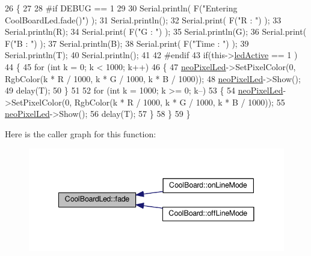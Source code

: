 \begin{DoxyCode}
26 \{
27 
28 \textcolor{preprocessor}{#if DEBUG == 1}
29 
30     Serial.println( F(\textcolor{stringliteral}{"Entering CoolBoardLed.fade()"}) );
31     Serial.println();
32     Serial.print( F(\textcolor{stringliteral}{"R : "}) );
33     Serial.println(R);
34     Serial.print( F(\textcolor{stringliteral}{"G : "}) );
35     Serial.println(G);
36     Serial.print( F(\textcolor{stringliteral}{"B : "}) );
37     Serial.println(B);
38     Serial.print( F(\textcolor{stringliteral}{"Time : "}) );
39     Serial.println(T);
40     Serial.println();
41 
42 \textcolor{preprocessor}{#endif  }
43     \textcolor{keywordflow}{if}(this->\hyperlink{class_cool_board_led_aadd04d2ecf123247718d77f42fba7f08}{ledActive} == 1 )
44     \{
45         \textcolor{keywordflow}{for} (\textcolor{keywordtype}{int} k = 0; k < 1000; k++) 
46         \{
47             \hyperlink{class_cool_board_led_ac2c13fa462a010cd9242bf297c013923}{neoPixelLed}->SetPixelColor(0, RgbColor(k * R / 1000, k * G / 1000, k * B / 1000));
48             \hyperlink{class_cool_board_led_ac2c13fa462a010cd9242bf297c013923}{neoPixelLed}->Show();
49             delay(T);
50         \}
51         
52         \textcolor{keywordflow}{for} (\textcolor{keywordtype}{int} k = 1000; k >= 0; k--) 
53         \{
54             \hyperlink{class_cool_board_led_ac2c13fa462a010cd9242bf297c013923}{neoPixelLed}->SetPixelColor(0, RgbColor(k * R / 1000, k * G / 1000, k * B / 1000));
55             \hyperlink{class_cool_board_led_ac2c13fa462a010cd9242bf297c013923}{neoPixelLed}->Show();
56             delay(T);
57         \}
58     \}
59 \}
\end{DoxyCode}
Here is the caller graph for this function\+:\nopagebreak
\begin{figure}[H]
\begin{center}
\leavevmode
\includegraphics[width=341pt]{de/dc0/class_cool_board_led_af1cacbaa88db8bcf6042c1083ba41155_icgraph}
\end{center}
\end{figure}
\mbox{\label{class_cool_board_led_ab778f5e7bed0ab74e3906d82110493c3}} 
